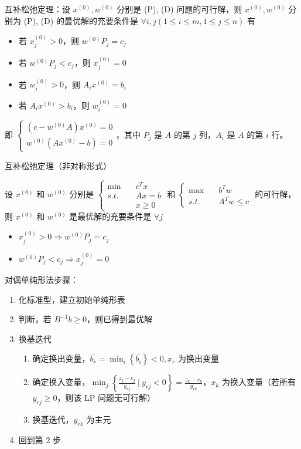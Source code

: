 \begin{remark}
    互补松弛定理：设 $x^{(0)}, w^{(0)}$ 分别是 (P), (D) 问题的可行解，则 $x^{(0)},w^{(0)}$ 分别为 (P), (D) 的最优解的充要条件是 $\forall i, j (1 \le i \le m, 1\le j \le n)$ 有 \begin{itemize}
        \item 若 $x_j^{(0)} > 0$，则 $w^{(0)}P_j = c_j$
        \item 若 $w^{(0)}P_j < c_j$，则 $x_j^{(0)} = 0$
        \item 若 $w_i^{(0)} > 0$，则 $A_ix^{(0)} = b_i$
        \item 若 $A_ix^{(0)} > b_i$，则 $w_i^{(0)} = 0$
    \end{itemize}
    即 $\begin{cases}
        (c - w^{(0)}A)x^{(0)} = 0\\
        w^{(0)}(Ax^{(0)} - b) = 0
    \end{cases}$，其中 $P_j$ 是 $A$ 的第 $j$ 列，$A_i$ 是 $A$ 的第 $i$ 行。

    互补松弛定理（非对称形式）

    设 $x^{(0)}$ 和 $w^{(0)}$ 分别是 $\begin{cases}
        \min \quad & c^Tx \\
        s.t. \quad & Ax = b\\
        &x \ge 0
    \end{cases}$ 和 $\begin{cases}
        \max \quad & b^Tw \\
        s.t. \quad & A^Tw \le c
    \end{cases}$ 的可行解，则 $x^{(0)}$ 和 $w^{(0)}$ 是最优解的充要条件是 $\forall j$ \begin{itemize}
        \item $x_j^{(0)} > 0 \Longrightarrow w^{(0)}P_j = c_j$
        \item $w^{(0)}P_j < c_j \Longrightarrow x_j^{(0)} = 0$
    \end{itemize}
\end{remark}

\begin{remark}
    对偶单纯形法步骤：
    \begin{enumerate}
        \item 化标准型，建立初始单纯形表
        \item 判断，若 $B^{-1}b \ge 0$，则已得到最优解
        \item 换基迭代 \begin{enumerate}
            \item 确定换出变量，$\bar{b_r} = \min_i\left\{\bar{b_i}\right\} < 0, x_r$ 为换出变量
            \item 确定换入变量，$\min_{j}\left\{\frac{z_j - c_j}{y_{rj}}\ |\ y_{rj} < 0\right\} = \frac{z_k - c_k}{y_{rk}}$，$x_k$ 为换入变量（若所有 $y_{rj} \ge 0$，则该 LP 问题无可行解）
            \item 换基迭代，$y_{rk}$ 为主元
        \end{enumerate}
        \item 回到第 2 步
    \end{enumerate}
\end{remark}

